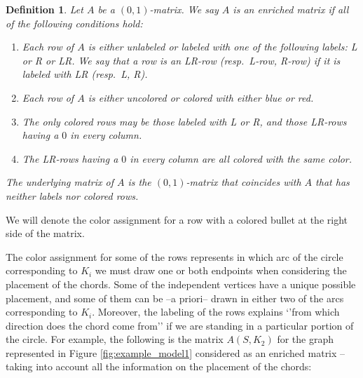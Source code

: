 \documentclass[12pt]{book}
\theoremstyle{plain}
\newtheorem{defn}[teo]{Definition}
\theoremstyle{remark}
\begin{document}
\begin{defn} \label{def:enriched_matrix}
	Let $A$ be a $(0,1)$-matrix. We say $A$ is an \emph{enriched matrix} if all of the following conditions hold:
	\begin{enumerate}
		\item Each row of $A$ is either unlabeled or labeled with one of the following labels: L or R or LR. We say that a row is an \emph{LR-row  (resp.\ L-row, R-row)} if it is labeled with LR (resp.\ L, R).
		\item Each row of $A$ is either uncolored or colored with either blue or red.
		\item The only colored rows may be those labeled with L or R, and those LR-rows having a $0$ in every column.
		\item The LR-rows having a $0$ in every column are all colored with the same color. 
	\end{enumerate}
	
	The \emph{underlying matrix of $A$} is the $(0,1)$-matrix that coincides with $A$ that has neither labels nor colored rows.
\end{defn}

We will denote the color assignment for a row with a colored bullet at the right side of the matrix.

The color assignment for some of the rows represents in which arc of the circle corresponding to $K_i$ we must draw one or both endpoints when considering the placement of the chords. Some of the independent vertices have a unique possible placement, and some of them can be --a priori-- drawn in either two of the arcs corresponding to $K_i$.
Moreover, the labeling of the rows explains `'from which direction does the chord come from'' if we are standing in a particular portion of the circle. 
For example, the following is the matrix $A(S,K_2)$ for the graph represented in Figure \ref{fig:example_model1} considered as an enriched matrix --taking into account all the information on the placement of the chords: %
\end{document}
